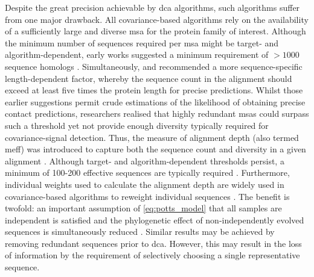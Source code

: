 Despite the great precision achievable by \gls{dca} algorithms, such algorithms suffer from one major drawback. All covariance-based algorithms rely on the availability of a sufficiently large and diverse \gls{msa} for the protein family of interest. Although the minimum number of sequences required per \gls{msa} might be target- and algorithm-dependent, early works suggested a minimum requirement of $>1000$ sequence homologs \cite{Jones2012-ks,Marks2012-ko,Andreani2015-qn}. Simultaneously, \textcite{Marks2011-os} and \textcite{Kamisetty2013-le} recommended a more sequence-specific length-dependent factor, whereby the sequence count in the alignment should exceed at least five times the protein length for precise predictions. Whilst those earlier suggestions permit crude estimations of the likelihood of obtaining precise contact predictions, researchers realised that highly redundant \gls{msa}s could surpass such a threshold yet not provide enough diversity typically required for covariance-signal detection. Thus, the measure of alignment depth (also termed \gls{meff}) was introduced to capture both the sequence count and diversity in a given alignment \cite{Morcos2011-lk,Hopf2012-zl,Skwark2014-qp,Jones2015-vq}. Although target- and algorithm-dependent thresholds persist, a minimum of 100-200 effective sequences are typically required \cite{Skwark2014-qp,Jones2015-vq}. Furthermore, individual weights used to calculate the alignment depth are widely used in covariance-based algorithms to reweight individual sequences \cite{Ekeberg2013-ay}. The benefit is twofold: an important assumption of \cref{eq:potts_model} that all samples are independent is satisfied and the phylogenetic effect of non-independently evolved sequences is simultaneously reduced \cite{Ekeberg2013-ay}. Similar results may be achieved by removing redundant sequences prior to \gls{dca}. However, this may result in the loss of information by the requirement of selectively choosing a single representative sequence.

